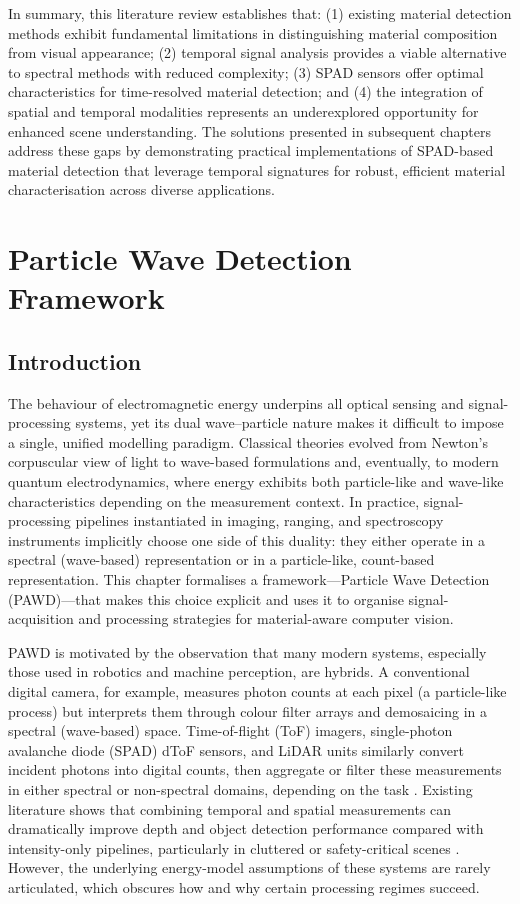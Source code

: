 \documentclass[12pt,a4paper,oneside]{report}
\let\oldsection\section
\renewcommand{\section}{\clearpage\oldsection}
\let\oldchapter\chapter
\renewcommand{\chapter}{\thispagestyle{fancy}\oldchapter}
\begin{document}
In summary, this literature review establishes that: (1) existing material detection methods exhibit fundamental limitations in distinguishing material composition from visual appearance; (2) temporal signal analysis provides a viable alternative to spectral methods with reduced complexity; (3) SPAD sensors offer optimal characteristics for time-resolved material detection; and (4) the integration of spatial and temporal modalities represents an underexplored opportunity for enhanced scene understanding. The solutions presented in subsequent chapters address these gaps by demonstrating practical implementations of SPAD-based material detection that leverage temporal signatures for robust, efficient material characterisation across diverse applications.


\newpage
\chapter{Particle Wave Detection Framework}
\label{chap:pawd}


\newpage
\section{Introduction}
\label{sec:pawd_introduction}

The behaviour of electromagnetic energy underpins all optical sensing and signal-processing systems, yet its dual wave–particle nature makes it difficult to impose a single, unified modelling paradigm. Classical theories evolved from Newton’s corpuscular view of light to wave-based formulations and, eventually, to modern quantum electrodynamics, where energy exhibits both particle-like and wave-like characteristics depending on the measurement context. In practice, signal-processing pipelines instantiated in imaging, ranging, and spectroscopy instruments implicitly choose one side of this duality: they either operate in a spectral (wave-based) representation or in a particle-like, count-based representation. This chapter formalises a framework—Particle Wave Detection (PAWD)—that makes this choice explicit and uses it to organise signal-acquisition and processing strategies for material-aware computer vision.

PAWD is motivated by the observation that many modern systems, especially those used in robotics and machine perception, are hybrids. A conventional digital camera, for example, measures photon counts at each pixel (a particle-like process) but interprets them through colour filter arrays and demosaicing in a spectral (wave-based) space. Time-of-flight (ToF) imagers, single-photon avalanche diode (SPAD) dToF sensors, and LiDAR units similarly convert incident photons into digital counts, then aggregate or filter these measurements in either spectral or non-spectral domains, depending on the task \cite{su2016,becker2023}. Existing literature shows that combining temporal and spatial measurements can dramatically improve depth and object detection performance compared with intensity-only pipelines, particularly in cluttered or safety-critical scenes \cite{moramartin2021,lyons2019}. However, the underlying energy-model assumptions of these systems are rarely articulated, which obscures how and why certain processing regimes succeed.
\end{document}
